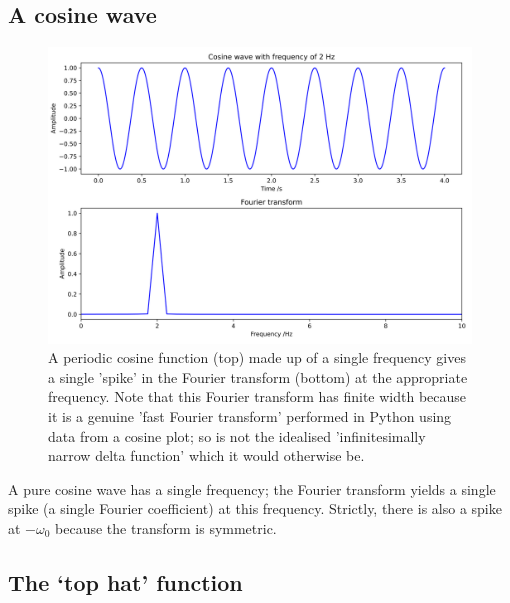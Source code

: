 \documentclass[
]{book}
\begin{document}
\hypertarget{sec:ch11-ftcosine}{%
\subsection{A cosine wave}\label{sec:ch11-ftcosine}}

\begin{figure}

{\centering \includegraphics[width=0.7\linewidth]{visualisations/ch11-ftcosinefunction1} 

}

\caption{A periodic cosine function (top) made up of a single frequency gives a single 'spike' in the Fourier transform (bottom) at the appropriate frequency. Note that this Fourier transform has finite width because it is a genuine 'fast Fourier transform' performed in Python using data from a cosine plot; so is not the idealised 'infinitesimally narrow delta function' which it would otherwise be.}\label{fig:ch11-ftcosinefunction1}
\end{figure}

A pure cosine wave has a single frequency; the Fourier transform yields a single spike (a single Fourier coefficient) at this frequency. Strictly, there is also a spike at \(-\omega_0\) because the transform is symmetric.

\hypertarget{sec:ch11-fttophat}{%
\subsection{The `top hat' function}\label{sec:ch11-fttophat}}
\end{document}
